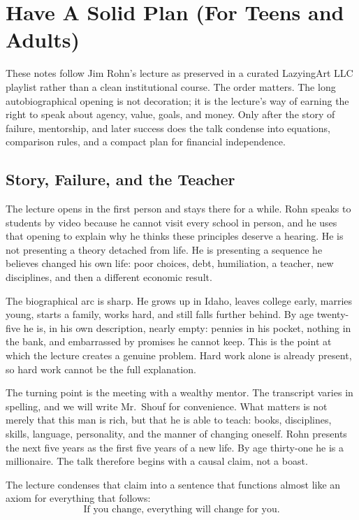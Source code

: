 \chapter{Have A Solid Plan (For Teens and Adults)}

These notes follow Jim Rohn's lecture as preserved in a curated LazyingArt LLC playlist rather than a clean institutional course. The order matters. The long autobiographical opening is not decoration; it is the lecture's way of earning the right to speak about agency, value, goals, and money. Only after the story of failure, mentorship, and later success does the talk condense into equations, comparison rules, and a compact plan for financial independence.

\section{Story, Failure, and the Teacher}

The lecture opens in the first person and stays there for a while. Rohn speaks to students by video because he cannot visit every school in person, and he uses that opening to explain why he thinks these principles deserve a hearing. He is not presenting a theory detached from life. He is presenting a sequence he believes changed his own life: poor choices, debt, humiliation, a teacher, new disciplines, and then a different economic result.

The biographical arc is sharp. He grows up in Idaho, leaves college early, marries young, starts a family, works hard, and still falls further behind. By age twenty-five he is, in his own description, nearly empty: pennies in his pocket, nothing in the bank, and embarrassed by promises he cannot keep. This is the point at which the lecture creates a genuine problem. Hard work alone is already present, so hard work cannot be the full explanation.

The turning point is the meeting with a wealthy mentor. The transcript varies in spelling, and we will write Mr.~Shouf for convenience. What matters is not merely that this man is rich, but that he is able to teach: books, disciplines, skills, language, personality, and the manner of changing oneself. Rohn presents the next five years as the first five years of a new life. By age thirty-one he is a millionaire. The talk therefore begins with a causal claim, not a boast.

The lecture condenses that claim into a sentence that functions almost like an axiom for everything that follows:
\begin{equation}
\text{If you change, everything will change for you.}
\end{equation}

